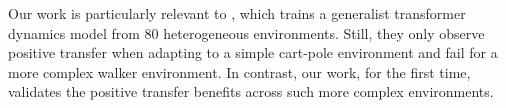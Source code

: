 Our work is particularly relevant to \citet{schubert2023generalist}, which trains a generalist transformer dynamics model from 80 heterogeneous environments. Still, they only observe positive transfer when adapting to a simple cart-pole environment and fail for a more complex walker environment. In contrast, our work, for the first time, validates the positive transfer benefits across such more complex environments.